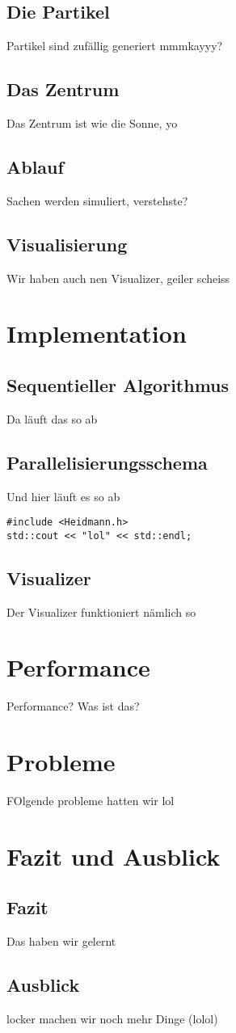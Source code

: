 \subsection{Die Partikel}
Partikel sind zufällig generiert mmmkayyy?

\subsection{Das Zentrum}
Das Zentrum ist wie die Sonne, yo

\subsection{Ablauf}
Sachen werden simuliert, verstehste?

\subsection{Visualisierung}
Wir haben auch nen Visualizer, geiler scheiss



\section{Implementation}
\subsection{Sequentieller Algorithmus}
Da läuft das so ab

\subsection{Parallelisierungsschema}
Und hier läuft es so ab

\begin{verbatim}
#include <Heidmann.h>
std::cout << "lol" << std::endl;
\end{verbatim}


\subsection{Visualizer}
Der Visualizer funktioniert nämlich so

\section{Performance}
Performance? Was ist das?

\section{Probleme}
FOlgende probleme hatten wir lol

\section{Fazit und Ausblick}
\subsection{Fazit}
Das haben wir gelernt
\subsection{Ausblick}
locker machen wir noch mehr Dinge (lolol)

